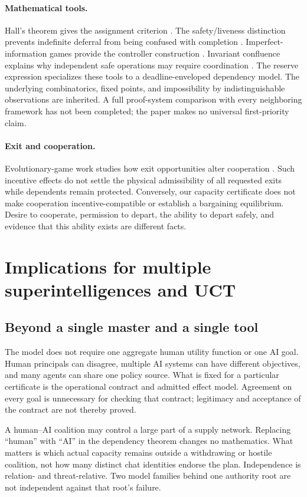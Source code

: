 \paragraph{Mathematical tools.}
Hall's theorem gives the assignment criterion \cite{hall}. The safety/liveness distinction prevents indefinite deferral from being confused with completion \cite{alpern}. Imperfect-information games provide the controller construction \cite{chatterjee}. Invariant confluence explains why independent safe operations may require coordination \cite{bailis}. The reserve expression specializes these tools to a deadline-enveloped dependency model. The underlying combinatorics, fixed points, and impossibility by indistinguishable observations are inherited. A full proof-system comparison with every neighboring framework has not been completed; the paper makes no universal first-priority claim.

\paragraph{Exit and cooperation.}
Evolutionary-game work studies how exit opportunities alter cooperation \cite{shen}. Such incentive effects do not settle the physical admissibility of all requested exits while dependents remain protected. Conversely, our capacity certificate does not make cooperation incentive-compatible or establish a bargaining equilibrium. Desire to cooperate, permission to depart, the ability to depart safely, and evidence that this ability exists are different facts.

\section{Implications for multiple superintelligences and UCT}
\subsection{Beyond a single master and a single tool}
The model does not require one aggregate human utility function or one AI goal. Human principals can disagree, multiple AI systems can have different objectives, and many agents can share one policy source. What is fixed for a particular certificate is the operational contract and admitted effect model. Agreement on every goal is unnecessary for checking that contract; legitimacy and acceptance of the contract are not thereby proved.

A human--AI coalition may control a large part of a supply network. Replacing ``human'' with ``AI'' in the dependency theorem changes no mathematics. What matters is which actual capacity remains outside a withdrawing or hostile coalition, not how many distinct chat identities endorse the plan. Independence is relation- and threat-relative. Two model families behind one authority root are not independent against that root's failure.

